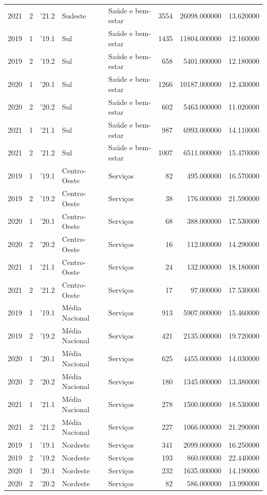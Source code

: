 \begin{longtable}{rrlllrrr}
2021 & 2 & '21.2 & Sudeste & Saúde e bem-estar & 3554 & 26098.000000 & 13.620000 \\
2019 & 1 & '19.1 & Sul & Saúde e bem-estar & 1435 & 11804.000000 & 12.160000 \\
2019 & 2 & '19.2 & Sul & Saúde e bem-estar & 658 & 5401.000000 & 12.180000 \\
2020 & 1 & '20.1 & Sul & Saúde e bem-estar & 1266 & 10187.000000 & 12.430000 \\
2020 & 2 & '20.2 & Sul & Saúde e bem-estar & 602 & 5463.000000 & 11.020000 \\
2021 & 1 & '21.1 & Sul & Saúde e bem-estar & 987 & 6993.000000 & 14.110000 \\
2021 & 2 & '21.2 & Sul & Saúde e bem-estar & 1007 & 6511.000000 & 15.470000 \\
2019 & 1 & '19.1 & Centro-Oeste & Serviços & 82 & 495.000000 & 16.570000 \\
2019 & 2 & '19.2 & Centro-Oeste & Serviços & 38 & 176.000000 & 21.590000 \\
2020 & 1 & '20.1 & Centro-Oeste & Serviços & 68 & 388.000000 & 17.530000 \\
2020 & 2 & '20.2 & Centro-Oeste & Serviços & 16 & 112.000000 & 14.290000 \\
2021 & 1 & '21.1 & Centro-Oeste & Serviços & 24 & 132.000000 & 18.180000 \\
2021 & 2 & '21.2 & Centro-Oeste & Serviços & 17 & 97.000000 & 17.530000 \\
2019 & 1 & '19.1 & Média Nacional & Serviços & 913 & 5907.000000 & 15.460000 \\
2019 & 2 & '19.2 & Média Nacional & Serviços & 421 & 2135.000000 & 19.720000 \\
2020 & 1 & '20.1 & Média Nacional & Serviços & 625 & 4455.000000 & 14.030000 \\
2020 & 2 & '20.2 & Média Nacional & Serviços & 180 & 1345.000000 & 13.380000 \\
2021 & 1 & '21.1 & Média Nacional & Serviços & 278 & 1500.000000 & 18.530000 \\
2021 & 2 & '21.2 & Média Nacional & Serviços & 227 & 1066.000000 & 21.290000 \\
2019 & 1 & '19.1 & Nordeste & Serviços & 341 & 2099.000000 & 16.250000 \\
2019 & 2 & '19.2 & Nordeste & Serviços & 193 & 860.000000 & 22.440000 \\
2020 & 1 & '20.1 & Nordeste & Serviços & 232 & 1635.000000 & 14.190000 \\
2020 & 2 & '20.2 & Nordeste & Serviços & 82 & 586.000000 & 13.990000 \\

\end{longtable}

